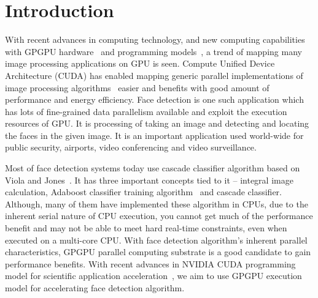 \section{Introduction}\label{sec:intro}

With recent advances in computing technology, and new computing capabilities
with GPGPU hardware~\cite{owens2008gpu} and programming models~\cite{nvidia2007compute}, 
a trend of mapping many image processing applications on GPU is seen. 
Compute Unified Device Architecture (CUDA) has enabled mapping generic parallel
implementations of image processing algorithms~\cite{yang2008parallel} easier and benefits with good amount of 
performance and energy efficiency. 
Face detection is one such application which has lots of fine-grained
data parallelism available and exploit the execution resources of GPU.
It is processing of taking an image and detecting and locating the faces 
in the given image. It is an important application used world-wide for
public security, airports, video conferencing and video surveillance. 

Most of face detection systems today use cascade classifier algorithm 
based on Viola and Jones~\cite{viola2001rapid}. It has three important 
concepts tied to it -- integral image calculation, Adaboost classifier training
algorithm~\cite{freund1999short} and cascade classifier.  
Although, many of them have implemented these algorithm in CPUs, due to 
the inherent serial nature of CPU execution, you cannot get much of the
performance benefit and may not be able to meet hard real-time constraints,
even when executed on a multi-core CPU. 
With face detection algorithm's inherent parallel characteristics, GPGPU 
parallel computing substrate is a good candidate to gain performance benefits. 
With recent advances in NVIDIA CUDA programming model for scientific application 
acceleration~\cite{buck2007gpu}, we aim to use GPGPU execution model for accelerating face detection algorithm.

